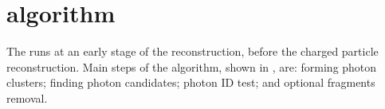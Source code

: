 



\section{\PhotonReconstruction algorithm}
\label{sec:photonRecostrcution}


The \PhotonReconstruction runs at an early stage of the reconstruction, before the charged particle reconstruction.   Main steps of the \PhotonReconstruction algorithm, shown in , are:  forming photon clusters; finding photon candidates; photon ID test; and optional fragments removal.



